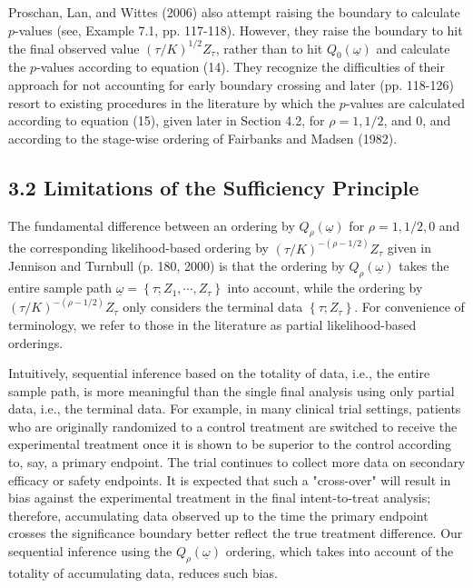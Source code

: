 \documentclass[10pt]{article}
\begin{document}
Proschan, Lan, and Wittes (2006) also attempt raising the boundary to calculate $p$-values (see, Example 7.1, pp. 117-118). However, they raise the boundary to hit the final observed value $(\tau / K)^{1 / 2} Z_{\tau}$, rather than to hit $Q_{0}(\underline{\omega})$ and calculate the $p$-values according to equation (14). They recognize the difficulties of their approach for not accounting for early boundary crossing and later (pp. 118-126) resort to existing procedures in the literature by which the $p$-values are calculated according to equation (15), given later in Section 4.2, for $\rho=1,1 / 2$, and 0, and according to the stage-wise ordering of Fairbanks and Madsen (1982).

\subsection*{3.2 Limitations of the Sufficiency Principle}
The fundamental difference between an ordering by $Q_{\rho}(\underline{\omega})$ for $\rho=1,1 / 2,0$ and the corresponding likelihood-based ordering by $(\tau / K)^{-(\rho-1 / 2)} Z_{\tau}$ given in Jennison and Turnbull (p. 180, 2000) is that the ordering by $Q_{\rho}(\underline{\omega})$ takes the\\
entire sample path $\underline{\omega}=\left\{\tau ; Z_{1}, \cdots, Z_{\tau}\right\}$ into account, while the ordering by $(\tau / K)^{-(\rho-1 / 2)} Z_{\tau}$ only considers the terminal data $\left\{\tau ; Z_{\tau}\right\}$. For convenience of terminology, we refer to those in the literature as partial likelihood-based orderings.

Intuitively, sequential inference based on the totality of data, i.e., the entire sample path, is more meaningful than the single final analysis using only partial data, i.e., the terminal data. For example, in many clinical trial settings, patients who are originally randomized to a control treatment are switched to receive the experimental treatment once it is shown to be superior to the control according to, say, a primary endpoint. The trial continues to collect more data on secondary efficacy or safety endpoints. It is expected that such a "cross-over" will result in bias against the experimental treatment in the final intent-to-treat analysis; therefore, accumulating data observed up to the time the primary endpoint crosses the significance boundary better reflect the true treatment difference. Our sequential inference using the $Q_{\rho}(\underline{\omega})$ ordering, which takes into account of the totality of accumulating data, reduces such bias.
\end{document}
